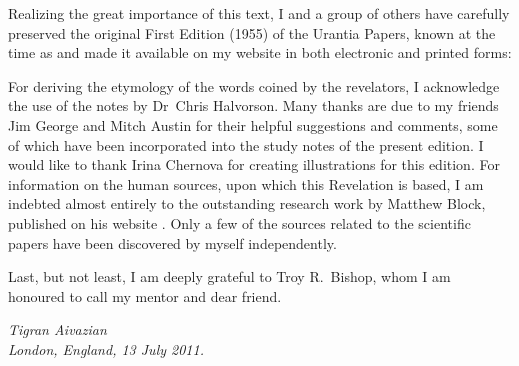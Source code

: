 Realizing the great importance of this text, I and a group of others have carefully preserved
the original First Edition (1955) of the Urantia Papers, known at the time as 
and made it available on my website in both electronic and printed forms:

\begin{center}
\end{center}

For deriving the etymology of the words coined by the revelators, I acknowledge the use of the notes by Dr~Chris Halvorson.
Many thanks are due to my friends Jim George and Mitch Austin for their helpful suggestions and comments,
some of which have been incorporated into the study notes of the present edition.
I would like to thank Irina Chernova for creating illustrations for this edition.
For information on the human sources, upon which this Revelation is based, I am indebted almost entirely to the outstanding
research work by Matthew Block, published on his website .
Only a few of the sources related to the scientific papers have been discovered by myself independently.

Last, but not least, I am deeply grateful to Troy R.~Bishop, whom I am honoured to call my mentor and dear friend.


\begin{flushleft}
\itshape
Tigran Aivazian\\
London, England, 13 July 2011.\\
\end{flushleft}
